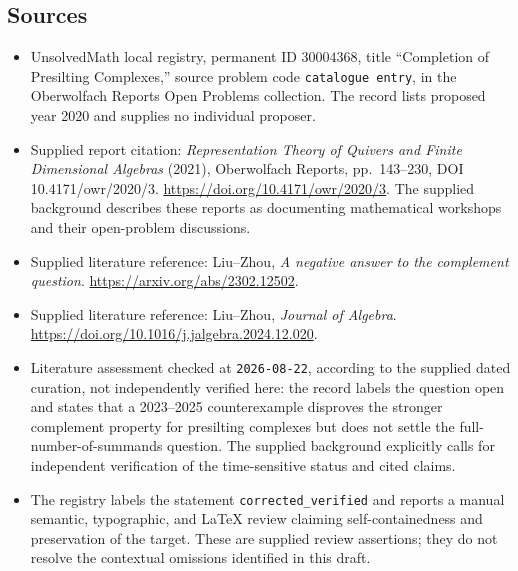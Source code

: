 \documentclass[11pt]{article}
\begin{document}
\subsection{Sources}
\begin{itemize}
\item UnsolvedMath local registry, permanent ID \(30004368\), title ``Completion of Presilting Complexes,'' source problem code \texttt{catalogue entry}, in the Oberwolfach Reports Open Problems collection. The record lists proposed year 2020 and supplies no individual proposer.
\item Supplied report citation: \emph{Representation Theory of Quivers and Finite Dimensional Algebras} (2021), Oberwolfach Reports, pp.~143--230, DOI 10.4171/owr/2020/3. \url{https://doi.org/10.4171/owr/2020/3}. The supplied background describes these reports as documenting mathematical workshops and their open-problem discussions.
\item Supplied literature reference: Liu--Zhou, \emph{A negative answer to the complement question}. \url{https://arxiv.org/abs/2302.12502}.
\item Supplied literature reference: Liu--Zhou, \emph{Journal of Algebra}. \url{https://doi.org/10.1016/j.jalgebra.2024.12.020}.
\item Literature assessment checked at \texttt{2026-08-22}, according to the supplied dated curation, not independently verified here: the record labels the question open and states that a 2023--2025 counterexample disproves the stronger complement property for presilting complexes but does not settle the full-number-of-summands question. The supplied background explicitly calls for independent verification of the time-sensitive status and cited claims.
\item The registry labels the statement \texttt{corrected\_verified} and reports a manual semantic, typographic, and LaTeX review claiming self-containedness and preservation of the target. These are supplied review assertions; they do not resolve the contextual omissions identified in this draft.
\end{itemize}
\end{document}
